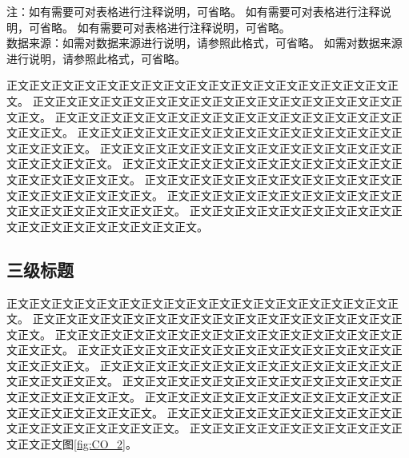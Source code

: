 \begin{table}[H]
  \small
  \caption{表格标题表格标题表格标题\label{tab:example1}}
  \vspace{1.5ex}
  \begin{minipage}{\textwidth}
    \phantom{缩进}注：如有需要可对表格进行注释说明，可省略。
    如有需要可对表格进行注释说明，可省略。
    如有需要可对表格进行注释说明，可省略。\\
    \phantom{缩进}数据来源：如需对数据来源进行说明，请参照此格式，可省略。 
    如需对数据来源进行说明，请参照此格式，可省略。
  \end{minipage}
\end{table}%
\vspace{-3ex}
正文正文正文正文正文正文正文正文正文正文正文正文正文正文正文正文正文正文。
正文正文正文正文正文正文正文正文正文正文正文正文正文正文正文正文正文正文。
正文正文正文正文正文正文正文正文正文正文正文正文正文正文正文正文正文正文。
正文正文正文正文正文正文正文正文正文正文正文正文正文正文正文正文正文正文。
正文正文正文正文正文正文正文正文正文正文正文正文正文正文正文正文正文正文。
正文正文正文正文正文正文正文正文正文正文正文正文正文正文正文正文正文正文。
正文正文正文正文正文正文正文正文正文正文正文正文正文正文正文正文正文正文。
正文正文正文正文正文正文正文正文正文正文正文正文正文正文正文正文正文正文。
正文正文正文正文正文正文正文正文正文正文正文正文正文正文正文正文正文正文。

\subsection{三级标题}
正文正文正文正文正文正文正文正文正文正文正文正文正文正文正文正文正文正文。
正文正文正文正文正文正文正文正文正文正文正文正文正文正文正文正文正文正文。
正文正文正文正文正文正文正文正文正文正文正文正文正文正文正文正文正文正文。
正文正文正文正文正文正文正文正文正文正文正文正文正文正文正文正文正文正文。
正文正文正文正文正文正文正文正文正文正文正文正文正文正文正文正文正文正文。
正文正文正文正文正文正文正文正文正文正文正文正文正文正文正文正文正文正文。
正文正文正文正文正文正文正文正文正文正文正文正文正文正文正文正文正文正文。
正文正文正文正文正文正文正文正文正文正文正文正文正文正文正文正文正文正文。
正文正文正文正文正文正文正文正文正文正文正文正文图\ref{fig:CO_2}。

